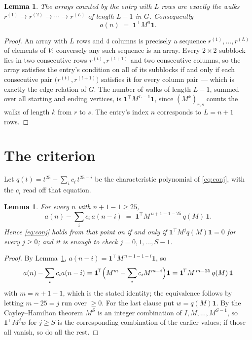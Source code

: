 \documentclass[11pt,a4paper]{article}
\theoremstyle{plain}
\newtheorem{lemma}[theorem]{Lemma}
\theoremstyle{definition}
\begin{document}
\begin{lemma}\label{lem:walk}
The arrays counted by the entry with $L$ rows are exactly the walks
$r^{(1)}\to r^{(2)}\to\cdots\to r^{(L)}$ of length $L-1$ in $G$. Consequently
\[
a(n)\;=\;\mathbf{1}^{\!\top}M^{n}\mathbf{1} .
\]
\end{lemma}

\begin{proof}
An array with $L$ rows and $4$ columns is precisely a sequence
$r^{(1)},\dots,r^{(L)}$ of elements of $V$; conversely any such sequence is an array.
Every $2\times2$ subblock lies in two consecutive rows $r^{(t)},r^{(t+1)}$ and two
consecutive columns, so the array satisfies the entry's condition on all of its subblocks
if and only if each consecutive pair $\bigl(r^{(t)},r^{(t+1)}\bigr)$ satisfies it for
every column pair --- which is exactly the edge relation of $G$. The number of walks of
length $L-1$, summed over all starting and ending vertices, is
$\mathbf{1}^{\!\top}M^{L-1}\mathbf{1}$, since $(M^{k})_{r,s}$ counts the walks of
length $k$ from $r$ to $s$. The entry's index $n$ corresponds to $L=n+1$ rows.
\end{proof}

\section{The criterion}

Let $q(t)=t^{25}-\sum_i c_i\,t^{25-i}$ be the characteristic polynomial of
\eqref{eq:conj}, with the $c_i$ read off that equation.

\begin{lemma}\label{lem:crit}
For every $n$ with $n+1-1\ge25$,
\[
a(n)-\sum_i c_i\,a(n-i)\;=\;\mathbf{1}^{\!\top}M^{\,n+1-1-25}\,q(M)\,\mathbf{1} .
\]
Hence \eqref{eq:conj} holds from that point on if and only if
$\mathbf{1}^{\!\top}M^{j}q(M)\mathbf{1}=0$ for every $j\ge0$; and it is enough to check
$j=0,1,\dots,S-1$.
\end{lemma}

\begin{proof}
By Lemma~\ref{lem:walk}, $a(n-i)=\mathbf{1}^{\!\top}M^{\,n+1-1-i}\mathbf{1}$, so
\[
a(n)-\sum_i c_i a(n-i)
=\mathbf{1}^{\!\top}\Bigl(M^{m}-\sum_i c_i M^{m-i}\Bigr)\mathbf{1}
=\mathbf{1}^{\!\top}M^{\,m-25}\,q(M)\,\mathbf{1}
\]
with $m=n+1-1$, which is the stated identity; the equivalence follows by letting
$m-25=j$ run over $\ge0$. For the last clause put $w=q(M)\mathbf{1}$. By the
Cayley--Hamilton theorem $M^{S}$ is an integer combination of $I,M,\dots,M^{S-1}$, so
$\mathbf{1}^{\!\top}M^{j}w$ for $j\ge S$ is the corresponding combination of the earlier
values; if those all vanish, so do all the rest.
\end{proof}
\end{document}
